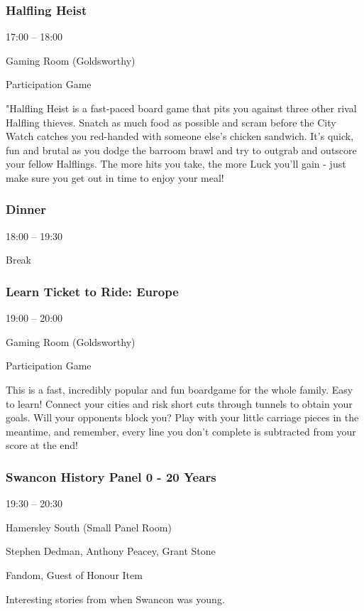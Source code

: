 \documentclass{scrreprt}
\begin{document}
\begin{multicols}{2}
\subsubsection*{Halfling Heist}\begin{description}
\setlength{\itemsep}{0pt}
\setlength{\parsep}{0pt}
\setlength{\parskip}{0pt}
\item[Time:]{17:00 -- 18:00}
\item[Venue:]{Gaming Room (Goldsworthy)}
\item[Tags:]{Participation Game}\end{description}
"Halfling Heist is a fast-paced board game that pits you against three other rival Halfling thieves. Snatch as much food as possible and scram before the City Watch catches you red-handed with someone else’s chicken sandwich. It’s quick, fun and brutal as you dodge the barroom brawl and try to outgrab and outscore your fellow Halflings. The more hits you take, the more Luck you’ll gain - just make sure you get out in time to enjoy your meal!
\subsubsection*{Dinner}\begin{description}
\setlength{\itemsep}{0pt}
\setlength{\parsep}{0pt}
\setlength{\parskip}{0pt}
\item[Time:]{18:00 -- 19:30}
\item[Tags:]{Break}\end{description}

\subsubsection*{Learn Ticket to Ride: Europe}\begin{description}
\setlength{\itemsep}{0pt}
\setlength{\parsep}{0pt}
\setlength{\parskip}{0pt}
\item[Time:]{19:00 -- 20:00}
\item[Venue:]{Gaming Room (Goldsworthy)}
\item[Tags:]{Participation Game}\end{description}
This is a fast, incredibly popular and fun boardgame for the whole family. Easy to learn! Connect your cities and risk short cuts through tunnels to obtain your goals. Will your opponents block you? Play with your little carriage pieces in the meantime, and remember, every line you don't complete is subtracted from your score at the end!
\subsubsection*{Swancon History Panel 0 - 20 Years}\begin{description}
\setlength{\itemsep}{0pt}
\setlength{\parsep}{0pt}
\setlength{\parskip}{0pt}
\item[Time:]{19:30 -- 20:30}
\item[Venue:]{Hamersley South (Small Panel Room)}
\item[People:]{Stephen Dedman, Anthony Peacey, Grant Stone}
\item[Tags:]{Fandom, Guest of Honour Item}\end{description}
Interesting stories from when Swancon was young.

\end{multicols}
\end{document}
